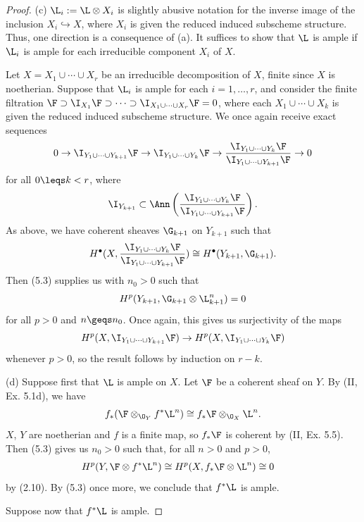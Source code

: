 \documentclass[12pt]{amsart}
\begin{document}
\begin{proof}
  (c) $\L_i:=\L\otimes X_i$ is slightly abusive notation for the inverse image of the inclusion $X_i\hookrightarrow X$, where $X_i$ is given the reduced induced subscheme structure.
  Thus, one direction is a consequence of (a).
  It suffices to show that $\L$ is ample if $\L_i$ is ample for each irreducible component $X_i$ of $X$.

  Let $X=X_1\cup\cdots\cup X_r$ be an irreducible decomposition of $X$, finite since $X$ is noetherian.
  Suppose that $\L_i$ is ample for each $i=1,\ldots, r$, and consider the finite filtration $\F\supset \I_{X_1}\F\supset\cdots \supset \I_{X_1\cup\cdots\cup X_r}\F=0$, where each $X_1\cup\cdots \cup X_k$ is given the reduced induced subscheme structure.
  We once again receive exact sequences
  \[
    0\to \I_{Y_1\cup\cdots\cup Y_{k+1}}\F\to \I_{Y_1\cup\cdots \cup Y_k}\F\to \frac{\I_{Y_1\cup\cdots \cup Y_k}\F} {\I_{Y_1\cup\cdots \cup Y_{k+1}} \F} \to 0
  \]
  for all $0\leqs k<r$, where
  \[
    \I_{Y_{k+1}}\subset \Ann \left(\frac{\I_{Y_1\cup\cdots \cup Y_k}\F} {\I_{Y_1\cup\cdots \cup Y_{k+1}} \F}\right).
  \]
  As above, we have coherent sheaves $\G_{k+1}$ on $Y_{k+1}$ such that
  \[
    H^\bullet(X,\frac{\I_{Y_1\cup\cdots \cup Y_k}\F} {\I_{Y_1\cup\cdots \cup Y_{k+1}} \F})\cong H^\bullet(Y_{k+1},\G_{k+1}).
  \]
  Then (5.3) supplies us with $n_0>0$ such that
  \[
    H^p(Y_{k+1},\G_{k+1}\otimes \L_{k+1}^n) = 0
  \] 
  for all $p>0$ and $n\geqs n_0$.
  Once again, this gives us surjectivity of the maps
  \[
    H^p(X,\I_{Y_1\cup\cdots \cup Y_{k+1}}\F)\to H^p(X,\I_{Y_1\cup\cdots\cup Y_k}\F)
  \] 
  whenever $p>0$, so the result follows by induction on $r-k$.

  (d) Suppose first that $\L$ is ample on $X$.
  Let $\F$ be a coherent sheaf on $Y$.
  By (II, Ex. 5.1d), we have
  \[
    f_*(\F\otimes_{\O_Y} f^*\L^n)\cong f_*\F\otimes_{\O_X} \L^n.
  \] 
  $X$, $Y$ are noetherian and $f$ is a finite map, so $f_*\F$ is coherent by (II, Ex. 5.5).
  Then (5.3) gives us $n_0>0$ such that, for all $n>0$ and $p>0$,
  \begin{align*}
    H^p(Y,\F\otimes f^*\L^n)
    &\cong H^p(X,f_*\F\otimes \L^n)
    \cong 0
  \end{align*}
  by (2.10). 
  By (5.3) once more, we conclude that $f^*\L$ is ample.

  Suppose now that $f^*\L$ is ample.
\end{proof}
\end{document}
